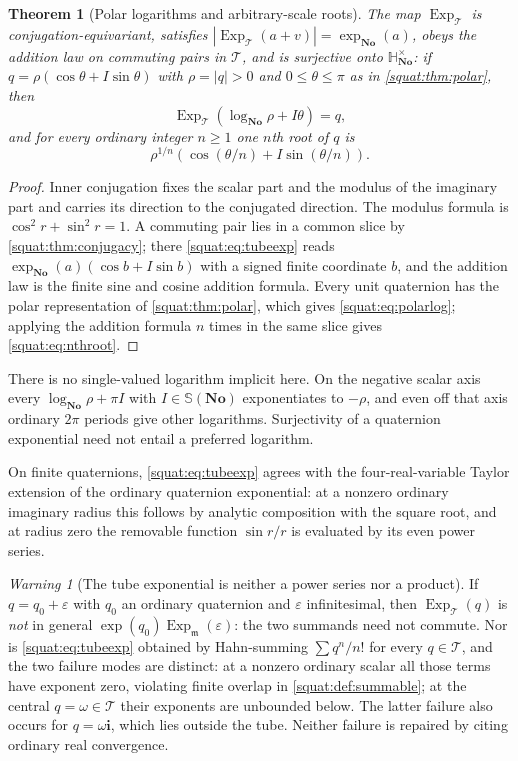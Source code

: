 \documentclass[11pt,letterpaper]{article}
\numberwithin{equation}{section}
\newtheorem{theorem}{Theorem}[section]
\theoremstyle{definition}
\theoremstyle{remark}
\newtheorem{warning}[warning]{Warning}
\newcommand{\No}{\mathbf{No}}
\newcommand{\SQ}{\mathbb H_{\No}}
\newcommand{\mm}{\mathfrak m}
\newcommand{\eps}{\varepsilon}
\newcommand{\ii}{\mathbf i}
\newcommand{\Exp}{\operatorname{Exp}}
\newcommand{\Expm}{\Exp_{\mm}}
\newcommand{\Expt}{\Exp_{\mathcal T}}
\newcommand{\abs}[1]{\left|#1\right|}
\begin{document}
\begin{theorem}[Polar logarithms and arbitrary-scale roots]\label{squat:thm:polarlog}
The map $\Expt$ is conjugation-equivariant, satisfies $\abs{\Expt(a+v)}=\exp_{\No}(a)$,
obeys the addition law on commuting pairs in $\mathcal T$, and is surjective onto
$\SQ^\times$: if $q=\rho(\cos\theta+I\sin\theta)$ with $\rho=\abs q>0$ and
$0\le\theta\le\pi$ as in \cref{squat:thm:polar}, then
\begin{equation}\label{squat:eq:polarlog}
 \Expt(\log_{\No}\rho+I\theta)=q ,
\end{equation}
and for every ordinary integer $n\ge1$ one $n$th root of $q$ is
\begin{equation}\label{squat:eq:nthroot}
 \rho^{1/n}\left(\cos(\theta/n)+I\sin(\theta/n)\right).
\end{equation}
\end{theorem}
\begin{proof}
Inner conjugation fixes the scalar part and the modulus of the imaginary part and carries
its direction to the conjugated direction. The modulus formula is
$\cos^2r+\sin^2r=1$. A commuting pair lies in a common slice by
\cref{squat:thm:conjugacy}; there \cref{squat:eq:tubeexp} reads
$\exp_{\No}(a)(\cos b+I\sin b)$ with a signed finite coordinate $b$, and the addition law
is the finite sine and cosine addition formula. Every unit quaternion has the polar
representation of \cref{squat:thm:polar}, which gives \cref{squat:eq:polarlog}; applying
the addition formula $n$ times in the same slice gives \cref{squat:eq:nthroot}.
\end{proof}

There is no single-valued logarithm implicit here. On the negative scalar axis every
$\log_{\No}\rho+\pi I$ with $I\in\mathbb S(\No)$ exponentiates to $-\rho$, and even off
that axis ordinary $2\pi$ periods give other logarithms. Surjectivity of a quaternion
exponential need not entail a preferred logarithm.

On finite quaternions, \cref{squat:eq:tubeexp} agrees with the four-real-variable Taylor
extension of the ordinary quaternion exponential: at a nonzero ordinary imaginary radius
this follows by analytic composition with the square root, and at radius zero the
removable function $\sin r/r$ is evaluated by its even power series.

\begin{warning}[The tube exponential is neither a power series nor a product]
\label{squat:warn:notaylor}
If $q=q_0+\eps$ with $q_0$ an ordinary quaternion and $\eps$ infinitesimal, then
$\Expt(q)$ is \emph{not} in general $\exp(q_0)\Expm(\eps)$: the two summands need not
commute. Nor is \cref{squat:eq:tubeexp} obtained by Hahn-summing $\sum q^n/n!$ for every
$q\in\mathcal T$, and the two failure modes are distinct: at a nonzero ordinary scalar all
those terms have exponent zero, violating finite overlap in
\cref{squat:def:summable}; at the central $q=\omega\in\mathcal T$ their exponents
are unbounded below. The latter failure also occurs for $q=\omega\ii$, which lies
outside the tube. Neither failure is repaired by citing ordinary real convergence.
\end{warning}
\end{document}
